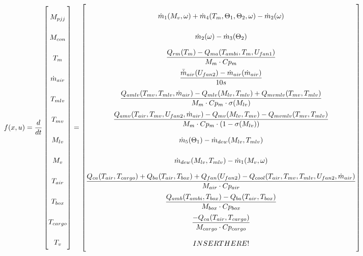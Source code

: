 \begin{equation} \label{eq:f_noSub} \renewcommand{\arraystretch}{2.4}
	f(x,u) =  \dfrac{d}{dt} \begin{bmatrix}
		M_{pjj}			\\				%
		M_{con} 		\\				%
		T_m 			\\				%
		\dot{m}_{air}	\\				%
		T_{mlv}			\\				%
		T_{mv}			\\				%
		M_{lv}			\\				%
		M_v				\\				%
		T_{air}			\\				%
		T_{box}			\\				%
		T_{cargo}		\\				%
		T_v				\\				%

	\end{bmatrix}
	=
	\begin{bmatrix}
		\dot{m}_1(M_{v}, \omega) + \dot{m}_4(T_m,\Theta_1,\Theta_2,\omega) - \dot{m}_2(\omega) \\										%
		\dot{m}_{2}(\omega) - \dot{m}_{3}(\Theta_2)	\\												%
		\dfrac{Q_{rm}(T_m) - Q_{ma}(T_{ambi}, T_m, U_{fan1})}{M_m \cdot Cp_m} \\									%
		\dfrac{\bar{\dot{m}}_{air}(U_{fan2})  - \dot{m}_{air}(\dot{m}_{air})} {10s}		\\					%
		\dfrac{Q_{amlv}(T_{mv},T_{mlv},\dot{m}_{air})-Q_{mlv}(M_{lv},T_{mlv}) + Q_{mvmlv}(T_{mv},T_{mlv})}{M_m \cdot Cp_m \cdot \sigma(M_{lv})}        \\	%
		\dfrac{Q_{amv}(T_{air},T_{mv},U_{fan2},\dot{m}_{air}) - Q_{mv}(M_{lv},T_{mv}) - Q_{mvmlv}(T_{mv},T_{mlv})}{M_m \cdot Cp_m \cdot (1- \sigma(M_{lv}))}	\\	%
		\dot{m}_{5}(\Theta_1) - \dot{m}_{dew}(M_{lv},T_{mlv})		\\											%
		\dot{m}_{dew}(M_{lv},T_{mlv}) - \dot{m}_1(M_{v}, \omega)	\\												%
		\dfrac{Q_{ca}(T_{air},T_{cargo}) + Q_{ba}(T_{air},T_{box}) + Q_{fan}(U_{fan2}) - Q_{cool}(T_{air},T_{mv},T_{mlv},U_{fan2},\dot{m}_{air})}{M_{air} \cdot Cp_{air}} \\					%
		\dfrac{Q_{amb}(T_{ambi},T_{box}) -  Q_{ba}(T_{air},T_{box})}{M_{box} \cdot Cp_{box}} \\							%
		\dfrac{-Q_{ca}(T_{air},T_{cargo})}{M_{cargo} \cdot Cp_{cargo}}									\\	%
		INSERT HERE! 
	\end{bmatrix}
\end{equation} 

